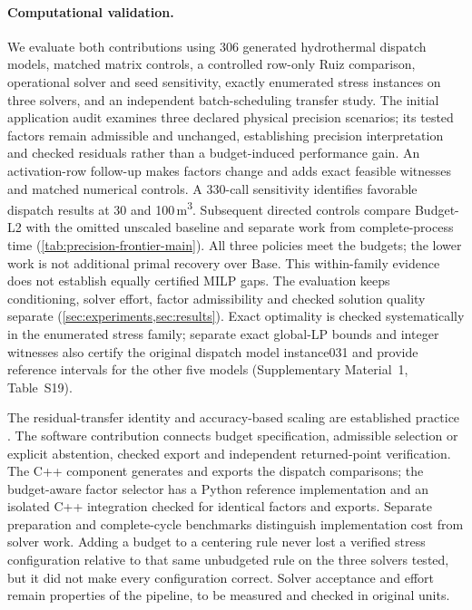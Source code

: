 \documentclass[11pt]{article}
\theoremstyle{definition}
\theoremstyle{remark}
\begin{document}
\paragraph{Computational validation.}
We evaluate both contributions using 306 generated hydrothermal dispatch models,
matched matrix controls, a controlled row-only Ruiz comparison, operational solver and
seed sensitivity, exactly enumerated stress instances on three solvers, and an
independent batch-scheduling transfer study.
The initial application audit examines three declared physical precision scenarios; its
tested factors remain admissible and unchanged, establishing precision
interpretation and checked residuals rather than a budget-induced performance gain.
An activation-row follow-up makes factors change and adds exact feasible witnesses
and matched numerical controls.
A 330-call sensitivity identifies favorable dispatch results at 30 and
100\,m\textsuperscript{3}. Subsequent directed controls compare Budget-L2 with
the omitted unscaled baseline and separate work from complete-process time
(\cref{tab:precision-frontier-main}). All three policies meet the budgets;
the lower work is not additional primal recovery over Base. This within-family
evidence does not establish equally certified MILP gaps. The evaluation keeps conditioning, solver effort,
factor admissibility and checked solution quality separate
(\cref{sec:experiments,sec:results}). Exact optimality is checked systematically in
the enumerated stress family; separate exact global-LP bounds and integer witnesses
also certify the original dispatch model instance031 and provide reference intervals
for the other five models (Supplementary Material~1, Table~S19).

The residual-transfer identity and accuracy-based scaling are established practice
\cite{gurobiExternalScaling,pritchett2017scaling}. The software contribution connects
budget specification, admissible selection or explicit abstention, checked export and
independent returned-point verification. The C++ component
generates and exports the dispatch comparisons; the budget-aware factor selector has a
Python reference implementation and an isolated C++ integration checked for identical
factors and exports. Separate preparation and complete-cycle benchmarks distinguish
implementation cost from solver work. Adding a budget to a centering rule never lost a verified stress
configuration relative to that same unbudgeted rule on the three solvers tested, but it did
not make every configuration correct. Solver acceptance and effort remain properties of the
pipeline, to be measured and checked in original units.
\end{document}
